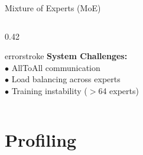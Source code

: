 \documentclass[aspectratio=169, 12pt]{beamer}
\begin{document}
\begin{frame}{Mixture of Experts (MoE)}
\begin{columns}[T]
\begin{column}{0.42\textwidth}
    \vspace{0.08cm}
    \begin{mlsyscard}{errorstroke}
    {\scriptsize\textbf{System Challenges:}\\
    $\bullet$ AllToAll communication\\
    $\bullet$ Load balancing across experts\\
    $\bullet$ Training instability ($>$64 experts)
    }
    \end{mlsyscard}
  \end{column}
\end{columns}

\end{frame}

\section{Profiling}
\end{document}
